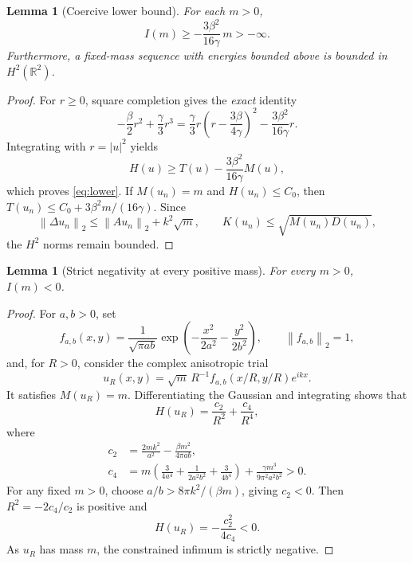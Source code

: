 \documentclass[11pt,letterpaper]{article}
\numberwithin{equation}{section}
\newtheorem{lemma}[theorem]{Lemma}
\newcommand{\RR}{\mathbb R}
\newcommand{\norm}[1]{\left\lVert #1\right\rVert}
\newcommand{\abs}[1]{\left\lvert #1\right\rvert}
\begin{document}
\begin{lemma}[Coercive lower bound]\label{lem:lower}
For each $m>0$,
\begin{equation}\label{eq:lower}
  I(m)\ge-\frac{3\beta^2}{16\gamma}\,m> -\infty.
\end{equation}
Furthermore, a fixed-mass sequence with energies bounded above is bounded in $H^2(\RR^2)$.
\end{lemma}
\begin{proof}
For $r\ge0$, square completion gives the \emph{exact} identity
\begin{equation}\label{eq:potential-square}
 -\frac{\beta}{2}r^2+\frac{\gamma}{3}r^3
 =\frac{\gamma}{3}r\left(r-\frac{3\beta}{4\gamma}\right)^2
 -\frac{3\beta^2}{16\gamma}r.
\end{equation}
Integrating with $r=\abs{u}^2$ yields
\[
 H(u)\ge T(u)-\frac{3\beta^2}{16\gamma}M(u),
\]
which proves \eqref{eq:lower}. If $M(u_n)=m$ and $H(u_n)\le C_0$, then $T(u_n)\le C_0+3\beta^2m/(16\gamma)$. Since
\[
 \norm{\Delta u_n}_2\le\norm{Au_n}_2+k^2\sqrt m,
 \qquad K(u_n)\le\sqrt{M(u_n)D(u_n)},
\]
the $H^2$ norms remain bounded.
\end{proof}

\begin{lemma}[Strict negativity at every positive mass]\label{lem:negative}
For every $m>0$, $I(m)<0$.
\end{lemma}
\begin{proof}
For $a,b>0$, set
\[
 f_{a,b}(x,y)=\frac{1}{\sqrt{\pi ab}}
 \exp\left(-\frac{x^2}{2a^2}-\frac{y^2}{2b^2}\right),
 \qquad \norm{f_{a,b}}_2=1,
\]
and, for $R>0$, consider the complex anisotropic trial
\[
 u_R(x,y)=\sqrt m\,R^{-1} f_{a,b}(x/R,y/R)e^{ikx}.
\]
It satisfies $M(u_R)=m$. Differentiating the Gaussian and integrating shows that
\begin{equation}\label{eq:gaussian-energy}
 H(u_R)=\frac{c_2}{R^2}+\frac{c_4}{R^4},
\end{equation}
where
\begin{align}
 c_2&=\frac{2mk^2}{a^2}-\frac{\beta m^2}{4\pi ab},\label{eq:c2}\\
 c_4&=m\left(\frac{3}{4a^4}+\frac{1}{2a^2b^2}
                   +\frac{3}{4b^4}\right)
       +\frac{\gamma m^3}{9\pi^2a^2b^2}>0.\label{eq:c4}
\end{align}
For any fixed $m>0$, choose $a/b>8\pi k^2/(\beta m)$, giving $c_2<0$. Then $R^2=-2c_4/c_2$ is positive and
\[
 H(u_R)=-\frac{c_2^2}{4c_4}<0.
\]
As $u_R$ has mass $m$, the constrained infimum is strictly negative.
\end{proof}
\end{document}
